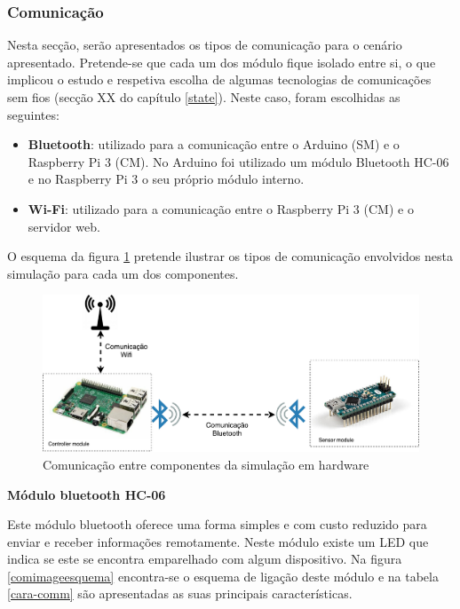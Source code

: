 \subsubsection{Comunicação}

Nesta secção, serão apresentados os tipos de comunicação para o cenário apresentado. Pretende-se que cada um dos módulo fique isolado entre si, o que implicou o estudo e respetiva escolha de algumas tecnologias de comunicações sem fios (secção XX do capítulo \ref{state}). Neste caso, foram escolhidas as seguintes: 

\begin{itemize}
	\item \textbf{Bluetooth}: utilizado para a comunicação entre o Arduino (\acl{SM}) e o Raspberry Pi 3 (\acl{CM}). No Arduino foi utilizado um módulo Bluetooth HC-06 e no Raspberry Pi 3 o seu próprio módulo interno. 
	\item \textbf{Wi-Fi}: utilizado para a comunicação entre o Raspberry Pi 3 (\acl{CM}) e o servidor web. 
\end{itemize}


O esquema da figura \ref{esquemcomm} pretende ilustrar os tipos de comunicação envolvidos nesta simulação para cada um dos componentes. 

\begin{figure}[!htb]
	\centering
	\includegraphics[width=\linewidth]{img/comm-blue/HW-geral.pdf}
	\caption{Comunicação entre componentes da simulação em hardware}
	\label{esquemcomm}
\end{figure}




\textbf{Módulo bluetooth HC-06}



Este módulo bluetooth oferece uma forma simples e com custo reduzido para enviar e receber informações remotamente. Neste módulo existe um \ac{LED} que indica se este se encontra emparelhado com algum dispositivo. Na figura \ref{comimageesquema} encontra-se o esquema de ligação deste módulo e na tabela \ref{cara-comm} são apresentadas as suas principais características.



